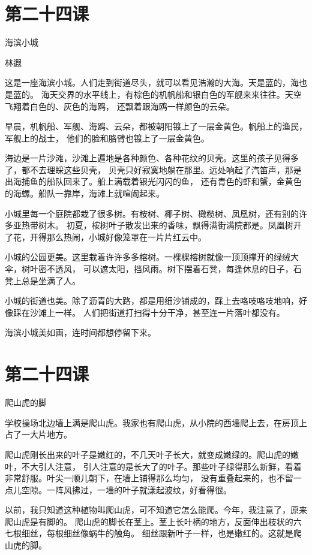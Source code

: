 \documentclass[12pt,UTF8]{ctexbook}
\begin{document}
\section{第二十四课}

海滨小城

林遐

这是一座海滨小城。人们走到街道尽头，就可以看见浩瀚的大海。天是蓝的，海也是蓝的。
海天交界的水平线上，有棕色的机帆船和银白色的军舰来来往往。天空飞翔着白色的、灰色的海鸥，
还飘着跟海鸥一样颜色的云朵。

早晨，机帆船、军舰、海鸥、云朵，都被朝阳镀上了一层金黄色。帆船上的渔民，军舰上的战士，
他们的脸和胳臂也镀上了一层金黄色。

海边是一片沙滩，沙滩上遍地是各种颜色、各种花纹的贝壳。这里的孩子见得多了，都不去理睬这些贝壳，
贝壳只好寂寞地躺在那里。远处响起了汽笛声，那是出海捕鱼的船队回来了。船上满载着银光闪闪的鱼，
还有青色的虾和蟹，金黄色的海螺。船队一靠岸，海滩上就喧闹起来。

小城里每一个庭院都栽了很多树。有桉树、椰子树、橄榄树、凤凰树，还有别的许多亚热带树木。
初夏，桉树叶子散发出来的香味，飘得满街满院都是。凤凰树开了花，开得那么热闹，小城好像笼罩在一片片红云中。

小城的公园更美。这里栽着许许多多榕树。一棵棵榕树就像一顶顶撑开的绿绒大伞，树叶密不透风，
可以遮太阳，挡风雨。树下摆着石凳，每逢休息的日子，石凳上总是坐满了人。

小城的街道也美。除了沥青的大路，都是用细沙铺成的，踩上去咯吱咯吱地响，好像踩在沙滩上一样。
人们把街道打扫得十分干净，甚至连一片落叶都没有。

海滨小城美如画，连时间都想停留下来。

\section{第二十四课}

爬山虎的脚

学校操场北边墙上满是爬山虎。我家也有爬山虎，从小院的西墙爬上去，在房顶上占了一大片地方。

爬山虎刚长出来的叶子是嫩红的，不几天叶子长大，就变成嫩绿的。爬山虎的嫩叶，不大引人注意，
引人注意的是长大了的叶子。那些叶子绿得那么新鲜，看着非常舒服。叶尖一顺儿朝下，在墙上铺得那么均匀，
没有重叠起来的，也不留一点儿空隙。一阵风拂过，一墙的叶子就漾起波纹，好看得很。

以前，我只知道这种植物叫爬山虎，可不知道它怎么能爬。今年，我注意了，原来爬山虎是有脚的。
爬山虎的脚长在茎上。茎上长叶柄的地方，反面伸出枝状的六七根细丝，每根细丝像蜗牛的触角。
细丝跟新叶子一样，也是嫩红的。这就是爬山虎的脚。
\end{document}
